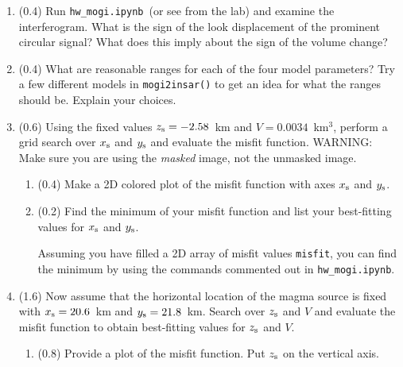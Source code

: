\documentclass[11pt,titlepage,fleqn]{article}
\newcommand{\tfile}{{\tt hw\_mogi.ipynb}}
\begin{document}
\begin{enumerate}
\item (0.4) Run \tfile\ (or see  from the lab) and examine the interferogram. What is the sign of the look displacement of the prominent circular signal? What does this imply about the sign of the volume change?

\item (0.4) What are reasonable ranges for each of the four model parameters? Try a few different models in \verb+mogi2insar()+ to get an idea for what the ranges should be. Explain your choices.

\item (0.6) Using the fixed values $z_{\rm s} = -2.58$~km and $V = 0.0034$~km$^3$, perform a grid search over $x_{\rm s}$ and $y_{\rm s}$ and evaluate the misfit function. WARNING: Make sure you are using the {\em masked} image, not the unmasked image.
%
\begin{enumerate}
\item (0.4) Make a 2D colored plot of the misfit function with axes $x_{\rm s}$ and $y_{\rm s}$.


\item (0.2) Find the minimum of your misfit function and list your best-fitting values for $x_{\rm s}$ and $y_{\rm s}$.

Assuming you have filled a 2D array of misfit values \verb+misfit+, you can find the minimum by using the commands commented out in \tfile.

\end{enumerate}

\item (1.6) Now assume that the horizontal location of the magma source is fixed with $x_{\rm s} = 20.6$~km and $y_{\rm s} = 21.8$~km. Search over $z_{\rm s}$ and $V$ and evaluate the misfit function to obtain best-fitting values for $z_{\rm s}$ and $V$.
%
\begin{enumerate}
\item (0.8) Provide a plot of the misfit function. Put $z_{\rm s}$ on the vertical axis.


\end{enumerate}
\end{enumerate}
\end{document}
